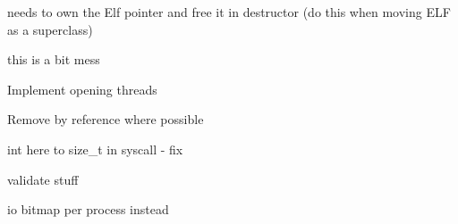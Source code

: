 \begin{DoxyRefList}
%
 needs to own the Elf pointer and free it in destructor (do this when moving ELF as a superclass)  
\item[Member \doxylink{classMaxOS_1_1processes_1_1resources_1_1ProcessResourceRegistry_a7e9c389f6b3198ba147d435b4d0b3430}{Max\+OS\+::processes\+::resources\+::Process\+Resource\+Registry\+::get\+\_\+resource} (const string \&name) final]\label{todo__todo000051}%
%
\textquotesingle{}this\textquotesingle{} is a bit mess  
\item[Member \doxylink{classMaxOS_1_1processes_1_1resources_1_1ThreadResourceRegistry_abd6699a205cfce698e0506245e7c6d78}{Max\+OS\+::processes\+::resources\+::Thread\+Resource\+Registry\+::create\+\_\+resource} (const string \&name, size\+\_\+t flags, uintptr\+\_\+t data) final]\label{todo__todo000049}%
%
Implement opening threads  
\item[Member \doxylink{classMaxOS_1_1processes_1_1Scheduler_af0094b696d420844c5475311e556dd70}{Max\+OS\+::processes\+::Scheduler\+::schedule\+\_\+next} (\doxylink{cpu_8h_a605489186b2c614af947b15ae8a77418}{system\+::cpu\+\_\+status\+\_\+t} \texorpdfstring{$\ast$}{*}status)]\label{todo__todo000054}%
%
Remove by reference where possible  
\item[Member \doxylink{classMaxOS_1_1processes_1_1SharedMessageEndpoint_a6baad0e7f448b66b3f811b4c0d8345e4}{Max\+OS\+::processes\+::Shared\+Message\+Endpoint\+::read} (void \texorpdfstring{$\ast$}{*}buffer, size\+\_\+t size, size\+\_\+t flags) final]\label{todo__todo000045}%
%
int here to size\+\_\+t in syscall -\/ fix  
\item[Member \doxylink{classMaxOS_1_1processes_1_1SharedMessageEndpoint_ac8a3516c7d883924b559a68a581efc2d}{Max\+OS\+::processes\+::Shared\+Message\+Endpoint\+::send} (const ipc\+\_\+iovec\+\_\+t \texorpdfstring{$\ast$}{*}vec, size\+\_\+t count)]\label{todo__todo000044}%
%
validate stuff  
\item[Class \doxylink{classMaxOS_1_1processes_1_1Thread}{Max\+OS\+::processes\+::Thread} ]\label{todo__todo000017}%
%
io bitmap per process instead  
\item[Member \doxylink{classMaxOS_1_1processes_1_1Thread_a1287ab4dd0133b3e7065a177717cdf77}{Max\+OS\+::processes\+::Thread\+::Thread} (void(\texorpdfstring{$\ast$}{*}\+\_\+entry\+\_\+point)(void \texorpdfstring{$\ast$}{*}), void \texorpdfstring{$\ast$}{*}args, int arg\+\_\+amount, \doxylink{classMaxOS_1_1processes_1_1Process}{Process} \texorpdfstring{$\ast$}{*}parent)]\label{todo__todo000046}%

\end{DoxyRefList}
